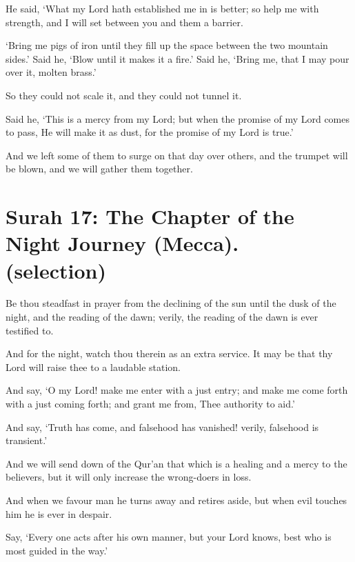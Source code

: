 \documentclass[fontsize=14pt, letterpaper, notitlepage, openany, DIV=12]{scrbook} %
\begin{document}
\noindent[18:95]
He said, `What my Lord hath established me in is better; so help me with strength, and I
will set between you and them a barrier.

\noindent[18:96]
`Bring me pigs of iron until they fill up the space between the two mountain sides.' Said
he, `Blow until it makes it a fire.' Said he, `Bring me, that I may pour over it, molten brass.'

\noindent[18:97]
So they could not scale it, and they could not tunnel it.

\noindent[18:98]
Said he, `This is a mercy from my Lord; but when the promise of my Lord comes to pass,
He will make it as dust, for the promise of my Lord is true.'

\noindent[18:99]
And we left some of them to surge on that day over others, and the trumpet will be
blown, and we will gather them together.


\section[Surah 17: The Chapter of the Night Journey (Mecca).]{Surah 17: The Chapter of the Night Journey (Mecca).\\ (selection)}


\noindent[17:78]
Be thou steadfast in prayer from the declining of the sun until the dusk of the night, and
the reading of the dawn; verily, the reading of the dawn is ever testified to.

\noindent[17:79]
And for the night, watch thou therein as an extra service. It may be that thy Lord will
raise thee to a laudable station.

\noindent[17:80]
And say, `O my Lord! make me enter with a just entry; and make me come forth with a
just coming forth; and grant me from, Thee authority to aid.'

\noindent[17:81]
And say, `Truth has come, and falsehood has vanished! verily, falsehood is transient.'

\noindent[17:82]
And we will send down of the Qur'an that which is a healing and a mercy to the
believers, but it will only increase the wrong-doers in loss.

\noindent[17:83]
And when we favour man he turns away and retires aside, but when evil touches him he
is ever in despair.

\noindent[17:84]
Say, `Every one acts after his own manner, but your Lord knows, best who is most
guided in the way.'
\end{document}
